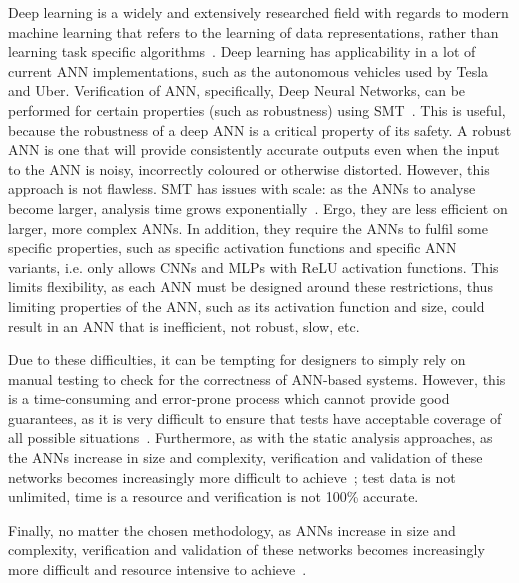 Deep learning is a widely and extensively researched field with regards to modern machine learning that refers to the learning of data representations, rather than learning task specific algorithms~\cite{schmidhuber2015deep}.
Deep learning has applicability in a lot of current \ac{ANN} implementations, such as the autonomous vehicles used by Tesla and Uber.
Verification of \ac{ANN}, specifically, Deep Neural Networks, can be performed for certain properties (such as robustness) using \ac{SMT}~\cite{Gehr2018AI2SA,DeepANNverify,reluplex}.
This is useful, because the robustness of a deep \ac{ANN} is a critical property of its safety.
A robust \ac{ANN} is one that will provide consistently accurate outputs even when the input to the \ac{ANN} is noisy, incorrectly coloured or otherwise distorted. 
However, this approach is not flawless. 
\ac{SMT} has issues with scale: as the \acp{ANN} to analyse become larger, analysis time grows exponentially~\cite{Gehr2018AI2SA}.
Ergo, they are less efficient on larger, more complex \acp{ANN}.
In addition, they require the \acp{ANN} to fulfil some specific properties, such as specific activation functions and specific \ac{ANN} variants, i.e. \cite{Gehr2018AI2SA} only allows \acp{CNN} and \acp{MLP} with \ac{ReLU} activation functions.
This limits flexibility, as each \ac{ANN} must be designed around these restrictions, thus limiting properties of the \ac{ANN}, such as its activation function and size, could result in an \ac{ANN} that is inefficient, not robust, slow, etc.

Due to these difficulties, it can be tempting for designers to simply rely on manual testing to check for the correctness of \ac{ANN}-based systems. 
However, this is a time-consuming and error-prone process which cannot provide good guarantees, as it is very difficult to ensure that tests have acceptable coverage of all possible situations~\cite{ANN-test}.
Furthermore, as with the static analysis approaches, as the \acp{ANN} increase in size and complexity, verification and validation of these networks becomes increasingly more difficult to achieve~\cite{Gehr2018AI2SA}; test data is not unlimited, time is a resource and verification is not 100\% accurate.

Finally, no matter the chosen methodology, as \acp{ANN} increase in size and complexity, verification and validation of these networks becomes increasingly more difficult and resource intensive to achieve~\cite{Gehr2018AI2SA}.

